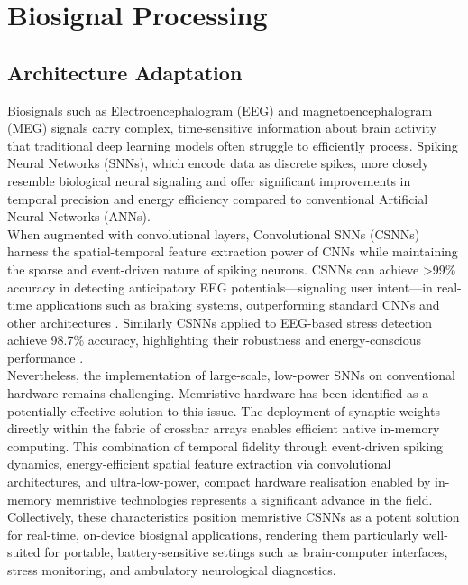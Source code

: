\section[Biosignal Processing]{Biosignal Processing}

\subsection{Architecture Adaptation}

Biosignals such as Electroencephalogram (EEG) and magnetoencephalogram (MEG) signals carry complex, time-sensitive information about brain activity that traditional deep learning models often struggle to efficiently process. Spiking Neural Networks (SNNs), which encode data as discrete spikes, more closely resemble biological neural signaling and offer significant improvements in temporal precision and energy efficiency compared to conventional Artificial Neural Networks (ANNs).\\

\noindent When augmented with convolutional layers, Convolutional SNNs (CSNNs) harness the spatial-temporal feature extraction power of CNNs while maintaining the sparse and event-driven nature of spiking neurons. CSNNs can achieve >99\% accuracy in detecting anticipatory EEG potentials—signaling user intent—in real-time applications such as braking systems, outperforming standard CNNs and other architectures \cite{lutes2024convolutional}. Similarly CSNNs applied to EEG-based stress detection achieve 98.7\% accuracy, highlighting their robustness and energy-conscious performance \cite{Joshi2025-sa}. \\

\noindent Nevertheless, the implementation of large-scale, low-power SNNs on conventional hardware remains challenging. Memristive hardware has been identified as a potentially effective solution to this issue. The deployment of synaptic weights directly within the fabric of crossbar arrays enables efficient native in-memory computing. This combination of temporal fidelity through event-driven spiking dynamics, energy-efficient spatial feature extraction via convolutional architectures, and ultra-low-power, compact hardware realisation enabled by in-memory memristive technologies represents a significant advance in the field.\\

\noindent Collectively, these characteristics position memristive CSNNs as a potent solution for real-time, on-device biosignal applications, rendering them particularly well-suited for portable, battery-sensitive settings such as brain-computer interfaces, stress monitoring, and ambulatory neurological diagnostics.\\


